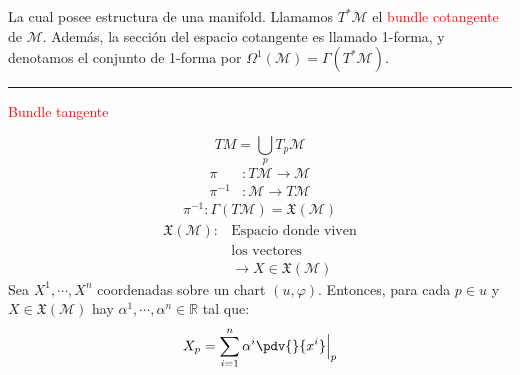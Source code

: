 \documentclass[../main]{subfiles}
\begin{document}
La cual posee estructura de una manifold. Llamamos $T^{*}\mathcal{M}$ el \textcolor{red}{bundle cotangente} de $\mathcal{M}$. Además, la sección del espacio cotangente es llamado 1-forma, y denotamos el conjunto de 1-forma por $\Omega^1(\mathcal{M})=\Gamma(T^{*}\mathcal{M})$.
\vspace{1cm}
\hrule

\begin{minipage}[t]{0.5\textwidth}
    \centerline{\textcolor{red}{Bundle tangente}}
    \begin{equation*}
        TM=\bigcup_p T_p \mathcal{M}
    \end{equation*}
    \vspace{-0.7cm}
    \begin{align*}
        \pi&: T\mathcal{M} \rightarrow \mathcal{M} \\
        \pi^{-1}&: \mathcal{M} \rightarrow T\mathcal{M}
    \end{align*}
    \vspace{-0.9cm}
    \begin{align*}
        \pi^{-1}: \Gamma(T\mathcal{M})=\mathfrak{X}(\mathcal{M})
    \end{align*}
    \vspace{-0.9cm}
    \begin{align*}
         \mathfrak{X}(\mathcal{M}): &\text{Espacio donde viven}\\
         &\text{los vectores}\\
         &\rightarrow X \in \mathfrak{X}(\mathcal{M})
    \end{align*}
    Sea $X^1, \cdots, X^n$ coordenadas sobre un chart $(u, \varphi)$. Entonces, para cada $p \in u$ y $X \in \mathfrak{X}(\mathcal{M})$ hay $\alpha^1, \cdots, \alpha^n \in \mathbb{R}$ tal que:
    \begin{equation*}
        X_p=\sum_{i=1}^n \alpha^{i}\pdv{}{x^{i}}\Big{|}_p
    \end{equation*}
\end{minipage}
    \hspace{0.01\textwidth} %
    \vrule %
    \hspace{0.01\textwidth} %
\end{document}
